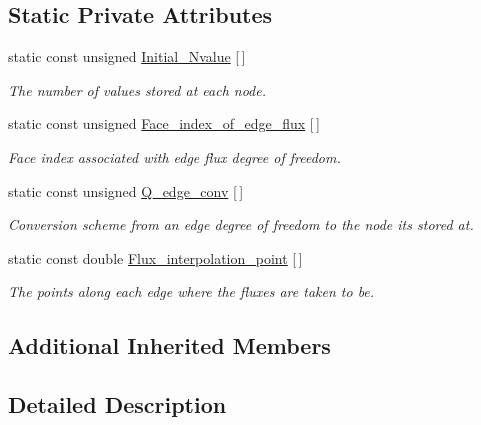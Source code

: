\subsection*{Static Private Attributes}
\begin{DoxyCompactItemize}
\item 
static const unsigned \hyperlink{classoomph_1_1TAxisymmetricPoroelasticityElement_a518f29c851f4062f3ef1b94f0076a902}{Initial\+\_\+\+Nvalue} \mbox{[}$\,$\mbox{]}
\begin{DoxyCompactList}\small\item\em The number of values stored at each node. \end{DoxyCompactList}\item 
static const unsigned \hyperlink{classoomph_1_1TAxisymmetricPoroelasticityElement_aeb45073b85caee99c4e18eb9de35503b}{Face\+\_\+index\+\_\+of\+\_\+edge\+\_\+flux} \mbox{[}$\,$\mbox{]}
\begin{DoxyCompactList}\small\item\em Face index associated with edge flux degree of freedom. \end{DoxyCompactList}\item 
static const unsigned \hyperlink{classoomph_1_1TAxisymmetricPoroelasticityElement_ae2a86834c98209802ce4e47997662012}{Q\+\_\+edge\+\_\+conv} \mbox{[}$\,$\mbox{]}
\begin{DoxyCompactList}\small\item\em Conversion scheme from an edge degree of freedom to the node it\textquotesingle{}s stored at. \end{DoxyCompactList}\item 
static const double \hyperlink{classoomph_1_1TAxisymmetricPoroelasticityElement_a84ede53b1b2d295bb379e43ed6f40782}{Flux\+\_\+interpolation\+\_\+point} \mbox{[}$\,$\mbox{]}
\begin{DoxyCompactList}\small\item\em The points along each edge where the fluxes are taken to be. \end{DoxyCompactList}\end{DoxyCompactItemize}
\subsection*{Additional Inherited Members}


\subsection{Detailed Description}
